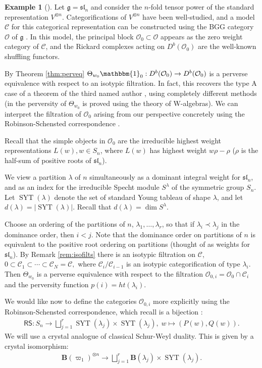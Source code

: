 \documentclass[11pt,reqno]{amsart}
\numberwithin{equation}{section}
\theoremstyle{definition}
\newtheorem{eg}[equation]{Example}
\newenvironment{example}[1][]{\begin{eg}[#1] \pushQED{\qed}}{\popQED \end{eg}}
\theoremstyle{named}
\newcommand{\bB}{\mathbf{B}}
\newcommand{\cC}{\mathcal{C}}
\newcommand{\cO}{\mathcal{O}}
\newcommand{\fg}{\mathfrak{g}}
\DeclareMathOperator{\SYT}{SYT}
\newcommand{\fsl}{\mathfrak{sl}}
\newcommand{\bone}{\mathbbm{1}}
\begin{document}
\begin{example}\label{ex:catO}
Let $\fg=\fsl_n$ and consider the $n$-fold tensor power of the standard representation $V^{\otimes n}$.  Categorifications of $V^{\otimes n}$ have been well-studied, and a model $\cC$ for this categorical representation can be constructed using the BGG category $\cO$ of $\fg$ \cite{Sussan2007, MS09}.  In this model, the principal block $\cO_0 \subset \cO$ appears as the zero weight category of $\cC$, and the Rickard complexes acting on $D^b(\cO_0)$ are the well-known shuffling functors.

By Theorem \ref{thm:perveq} $\Theta_{w_0}\bone_0:D^b(\cO_0)\to D^b(\cO_0)$ is a perverse equivalence with respect to an isotypic filtration.  In fact, this recovers the type A case of a theorem of the third named author \cite{LosCacti}, using completely different methods (in \cite{LosCacti} the perversity of $\Theta_{w_0}$ is proved using the theory of W-algebras).  We can interpret the filtration of $\cO_0$ arising from our perspective concretely using the Robinson-Schensted correspondence .  

Recall that the simple objects in $\cO_0$ are the irreducible highest weight representations $L(w), w \in S_n$, where $L(w)$ has highest weight $w\rho-\rho$ ($\rho$ is the half-sum of positive roots of $\fsl_n$). 

We view a partition $\lambda$ of $n$  simultaneously as a dominant integral weight for $\fsl_n$, and as an index for the irreducible Specht module $S^\lambda$ of the symmetric group $S_n$. Let $\SYT(\lambda)$ denote the set of standard Young tableau of shape $\lambda$, and let $d(\lambda)=|\SYT(\lambda)|$.  Recall that $d(\lambda)=\dim S^\lambda$.  

Choose an ordering of the partitions of $n$, $\lambda_1,\hdots,\lambda_r$, so that if $\lambda_i \prec \lambda_j$ in the dominance order, then $i<j$.  Note that the dominance order on partitions of $n$ is equivalent to the positive root ordering on partitions (thought of as weights for $\fsl_n$).
By Remark \ref{rem:isofilts} there is an isotypic filtration on $\cC$,
$
0 \subset \cC_1 \subset \cdots\subset \cC_N=\cC,
$
where  $\cC_i/\cC_{i-1}$ is an isotypic categorification of type $\lambda_i$.  Then  $\Theta_{w_0}$ is a perverse equivalence with respect to the filtration $\cO_{0,i} = \cO_0\cap \cC_i$ and the perversity function $p(i)=ht(\lambda_i)$.


We would like now to define the categories $\cO_{0,i}$ more explicitly using the Robinson-Schensted correspondence, which recall is a bijection \cite{Sagan}:
\begin{align*}
\mathsf{RS}:S_n \longrightarrow \bigsqcup_{j=1}^r\SYT(\lambda_j)\times\SYT(\lambda_j), \; w \mapsto (P(w),Q(w)).
\end{align*}
We will use a crystal analogue of classical Schur-Weyl duality.  This is given by a crystal isomorphism: 
\begin{align}\label{eq:crystalSW}
\bB(\varpi_1)^{\otimes n} \longrightarrow \bigsqcup_{j=1}^r \bB(\lambda_j)\times\SYT(\lambda_j).
\end{align}


\end{example}
\end{document}
